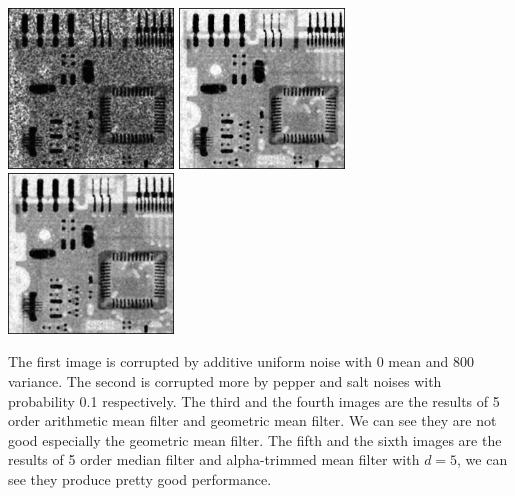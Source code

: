\documentclass{article}
\begin{document}
\includegraphics[width=0.33\textwidth]{../data/geometric_mean_uniform_pepper_salt_Circuit.jpg}
\includegraphics[width=0.33\textwidth]{../data/median_uniform_pepper_salt_Circuit.jpg}
\includegraphics[width=0.33\textwidth]{../data/alpha_trimmed_mean_uniform_pepper_salt_Circuit.jpg}

The first image is corrupted by additive uniform noise with 0 mean and 800 variance. The second is corrupted more by pepper and salt noises with probability 0.1 respectively. The third and the fourth images are the results of 5 order arithmetic mean filter and geometric mean filter. We can see they are not good especially the geometric mean filter. The fifth and the sixth images are the results of 5 order median filter and alpha-trimmed mean filter with $d=5$, we can see they produce pretty good performance.
\end{document}
